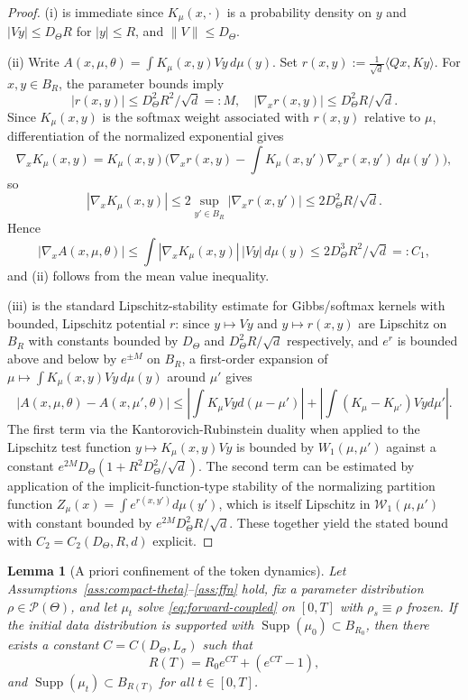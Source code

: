 \documentclass[11pt,a4wide]{article}
\newtheorem{lemma}[theorem]{Lemma}
\theoremstyle{definition}
\newcommand{\Prob}{\mathcal{P}}
\newcommand{\Wass}{\mathcal{W}}
\DeclareMathOperator{\Supp}{Supp}
\begin{document}
\begin{proof}
(i) is immediate since $K_\mu(x,\cdot)$ is a probability density on $y$ and $|Vy|\le D_\Theta R$ for $|y|\le R$, and $\|V\|\le D_\Theta$.

(ii) Write $A(x,\mu,\theta)=\int K_\mu(x,y)Vy\,d\mu(y)$. Set $r(x,y):=\tfrac1{\sqrt d}\langle Qx,Ky\rangle$. For $x,y\in B_R$, the parameter bounds imply 
$$
|r(x,y)|\le  D_\Theta^2R^2/\sqrt d =: M, \quad 
|\nabla_xr(x,y)|\le D_\Theta^2 R/\sqrt d. 
$$
Since $K_\mu(x,y)$  is the softmax weight associated with $r(x,y)$ relative to $\mu$, differentiation of the normalized exponential gives
$$
\nabla_x K_\mu(x,y) = K_\mu(x,y)\Big(\nabla_x r(x,y) - \int K_\mu(x,y')\nabla_x r(x,y')\,d\mu(y')\Big),
$$
so 
$$
|\nabla_x K_\mu(x,y)|\le 2 \sup_{y' \in B_R} |\nabla_x r(x, y')| \leq 2D_\Theta^2R /\sqrt d.
$$ 
Hence 
$$
|\nabla_x A(x,\mu,\theta)| \le \int |\nabla_xK_\mu(x,y)|\,|Vy|\,d\mu(y) \le 2D_\Theta^3R^2 /\sqrt d =: C_1,
$$
 and (ii) follows from the mean value inequality.

(iii) is the standard Lipschitz-stability estimate for Gibbs/softmax kernels with bounded, Lipschitz potential $r$: since $y\mapsto Vy$ and $y\mapsto r(x,y)$ are Lipschitz on $B_R$ with constants bounded by $D_\Theta$ and $D_\Theta^2R/\sqrt d$ respectively, and $e^{r}$ is bounded above and below by $e^{\pm M}$ on $B_R$, a first-order expansion of $\mu\mapsto\int K_\mu(x,y)Vy\,d\mu(y)$ around $\mu'$ gives 
$$
|A(x, \mu, \theta)-A(x, \mu', \theta)| \leq 
\left| \int K_\mu Vy d(\mu-\mu') \right| +  \left|\int(K_\mu -K_{\mu'})Vyd\mu' \right|. 
$$
The first term via the Kantorovich-Rubinstein duality when applied to the Lipschitz test function $y\mapsto K_\mu(x,y)Vy$ is bounded by 
$W_1(\mu, \mu')$ against a constant $ e^{2M}D_\Theta (1+R^2D_\Theta^2/\sqrt{d})$.  The second term can be estimated by application of the implicit-function-type stability of the normalizing partition function $Z_\mu(x)=\int e^{r(x,y')}d\mu(y')$, which is itself Lipschitz in $\Wass_1(\mu,\mu')$ with constant bounded by $e^{2M}D_\Theta^2R/\sqrt d$. These together yield the stated bound with $C_2=C_2(D_\Theta,R,d)$ explicit. 
\end{proof}

\begin{lemma}[A priori confinement of the token dynamics]
\label{lem:apriori}
Let Assumptions~\ref{ass:compact-theta}--\ref{ass:ffn} hold, fix a parameter distribution $\rho\in\Prob(\Theta)$, and let $\mu_t$ solve \eqref{eq:forward-coupled}  on $[0,T]$ with $\rho_s\equiv\rho$ frozen. If the initial data distribution  is supported with  $\Supp(\mu_0)\subset B_{R_0}$, then there exists  a constant $C=C(D_\Theta,L_\sigma)$ such that 
$$
R(T)=R_0 e^{CT} + (e^{CT}-1),
$$
and $\Supp(\mu_t)\subset B_{R(T)}$ for all $t\in[0,T]$.
\end{lemma}
\end{document}
